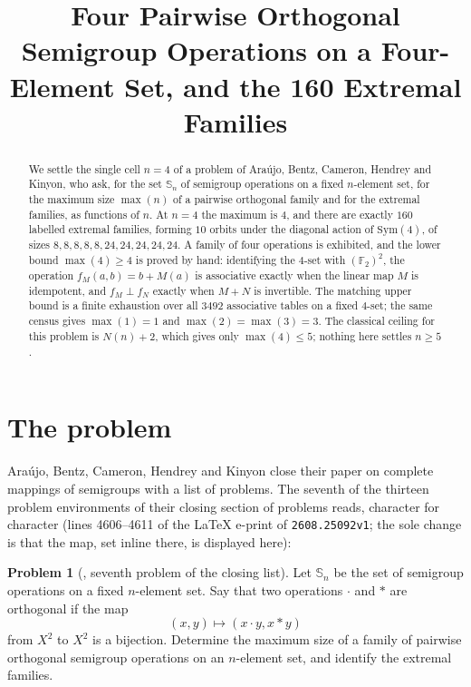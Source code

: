 \documentclass[11pt]{amsart}
\title[Four orthogonal semigroup operations on a four-element set]
{Four Pairwise Orthogonal Semigroup Operations on a Four-Element Set,
and the 160 Extremal Families}
\date{}
\theoremstyle{remark}
\theoremstyle{definition}
\newtheorem*{problemA}{Problem}
\newcommand{\Sops}{\mathbb S}
\newcommand{\FF}{\mathbb F}
\newcommand{\Nmols}{N}
\begin{document}
\begin{abstract}
We settle the single cell $n=4$ of a problem of Ara\'ujo, Bentz, Cameron, Hendrey and Kinyon, who
ask, for the set $\Sops_n$ of semigroup operations on a fixed $n$-element set, for the maximum size
$\max(n)$ of a pairwise orthogonal family and for the extremal families, as functions of $n$. At
$n=4$ the maximum is $4$, and there are exactly $160$
labelled extremal families, forming $10$ orbits under the diagonal action of $\mathrm{Sym}(4)$, of
sizes $8,8,8,8,8,24,24,24,24,24$. A family of four operations is exhibited, and the lower bound
$\max(4)\ge4$ is proved by hand: identifying the $4$-set with $(\FF_2)^2$, the operation
$f_M(a,b)=b+M(a)$ is associative exactly when the linear map $M$ is idempotent, and $f_M\perp f_N$
exactly when $M+N$ is invertible. The matching upper bound is a finite exhaustion over all $3492$
associative tables on a fixed $4$-set; the same census gives $\max(1)=1$ and $\max(2)=\max(3)=3$.
The classical ceiling for this problem is
$\Nmols(n)+2$, which gives only $\max(4)\le5$; nothing here settles $n\ge5$.
\end{abstract}

\maketitle

\section{The problem}

Ara\'ujo, Bentz, Cameron, Hendrey and Kinyon close their paper on complete mappings of semigroups
\cite{ABCHK} with a list of problems. The seventh of the thirteen problem environments of their
closing section of problems reads, character for character (lines 4606--4611 of the \LaTeX{} e-print
of \texttt{2608.25092v1}; the sole change is that the map, set inline there, is displayed here):

\begin{problemA}[\cite{ABCHK}, seventh problem of the closing list]
Let $\Sops_n$ be the set of semigroup operations on a fixed $n$-element set. Say that two operations
$\cdot$ and $\ast$ are orthogonal if the map
\[(x,y)\longmapsto (x\cdot y,x\ast y)\]
from $X^2$ to $X^2$ is a bijection. Determine the maximum size of a family of pairwise orthogonal
semigroup operations on an $n$-element set, and identify the extremal families.
\end{problemA}
\end{document}
